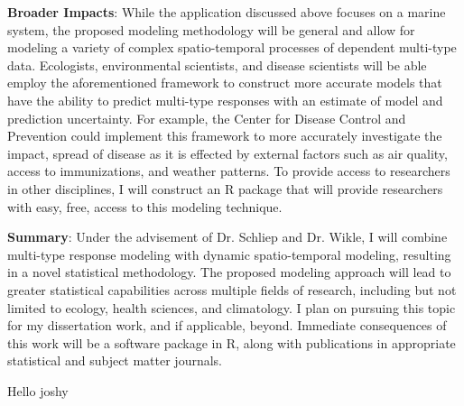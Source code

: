 \documentclass[12pt]{article}
\begin{document}
\vspace{2mm}

\noindent \textbf{Broader Impacts}: While the application discussed above focuses on a marine system, the proposed modeling methodology will be general and allow for modeling a variety of complex spatio-temporal processes of dependent multi-type data. Ecologists, environmental scientists, and disease scientists will be able employ the aforementioned framework to construct more accurate models that have the ability to predict multi-type responses with an estimate of model and prediction uncertainty. For example, the Center for Disease Control and Prevention could implement this framework to more accurately investigate the impact, spread of disease as it is effected by external factors such as air quality, access to immunizations, and weather patterns. To provide access to researchers in other disciplines, I will construct an R package that will provide researchers with easy, free, access to this modeling technique.


\vspace{2mm}

\noindent \textbf{Summary}: Under the advisement of Dr. Schliep and Dr. Wikle, I will combine multi-type response modeling with dynamic spatio-temporal modeling, resulting in a novel statistical methodology. The proposed modeling approach will lead to greater statistical capabilities across multiple fields of research, including but not limited to ecology, health sciences, and climatology. I plan on pursuing this topic for my dissertation work, and if applicable, beyond. Immediate consequences of this work will be a software package in R, along with publications in appropriate statistical and subject matter journals.

Hello joshy

{\footnotesize }
\end{document}
